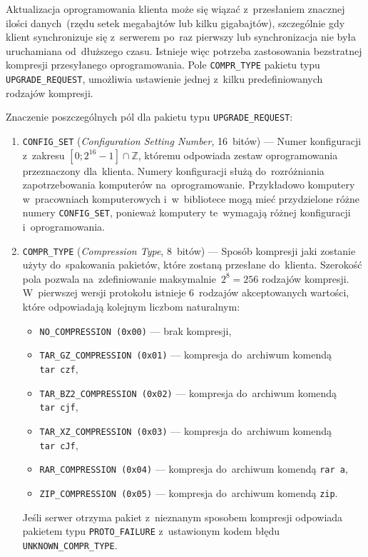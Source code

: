 \documentclass[thesis]{subfiles}
\begin{document}
Aktualizacja oprogramowania klienta może się wiązać z~przesłaniem znacznej ilości danych~(rzędu setek megabajtów lub kilku gigabajtów), szczególnie gdy klient synchronizuje się z~serwerem po~raz pierwszy lub synchronizacja nie była uruchamiana od~dłuższego czasu. Istnieje więc potrzeba zastosowania bezstratnej kompresji przesyłanego oprogramowania. Pole \texttt{COMPR\_TYPE} pakietu typu \texttt{UPGRADE\_REQUEST}, umożliwia ustawienie jednej z~kilku predefiniowanych rodzajów kompresji.

Znaczenie poszczególnych pól dla pakietu typu \texttt{UPGRADE\_REQUEST}:\mynobreakpar
\begin{enumerate}
	\item \texttt{CONFIG\_SET} (\emph{Configuration Setting Number}, 16~bitów) --- Numer konfiguracji z~zakresu $[0;2^{16}-1]\cap\mathbb{Z}$, któremu odpowiada zestaw oprogramowania przeznaczony dla~klienta. Numery konfiguracji służą do~rozróżniania zapotrzebowania komputerów na~oprogramowanie. Przykładowo komputery w~pracowniach komputerowych i~w~bibliotece mogą mieć przydzielone różne numery \texttt{CONFIG\_SET}, ponieważ komputery te~wymagają różnej konfiguracji i~oprogramowania.
	\item \texttt{COMPR\_TYPE} (\emph{Compression Type}, 8~bitów) --- Sposób kompresji jaki zostanie użyty do~spakowania pakietów, które zostaną przesłane do~klienta. Szerokość pola pozwala na~zdefiniowanie maksymalnie~$2^8=256$ rodzajów kompresji. W~pierwszej wersji protokołu istnieje 6~rodzajów akceptowanych wartości, które odpowiadają kolejnym liczbom naturalnym:
		\begin{itemize}
			\item \texttt{NO\_COMPRESSION (0x00)} --- brak kompresji,
			\item \texttt{TAR\_GZ\_COMPRESSION (0x01)} --- kompresja do~archiwum  komendą \texttt{tar~czf},
			\item \texttt{TAR\_BZ2\_COMPRESSION (0x02)} --- kompresja do~archiwum  komendą \texttt{tar~cjf},
			\item \texttt{TAR\_XZ\_COMPRESSION (0x03)} --- kompresja do~archiwum  komendą \texttt{tar~cJf},
			\item \texttt{RAR\_COMPRESSION (0x04)} --- kompresja do~archiwum  komendą \texttt{rar~a},
			\item \texttt{ZIP\_COMPRESSION (0x05)} --- kompresja do~archiwum  komendą \texttt{zip}.
		\end{itemize}
	Jeśli serwer otrzyma pakiet z~nieznanym sposobem kompresji odpowiada pakietem typu \texttt{PROTO\_FAILURE} z~ustawionym kodem błędu \texttt{UNKNOWN\_COMPR\_TYPE}.

\end{enumerate}
\end{document}
